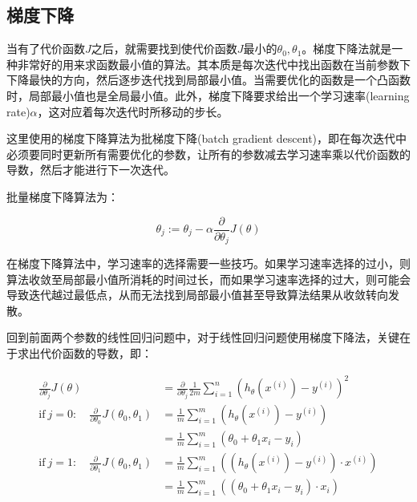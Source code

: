 \documentclass[12pt, a4paper]{article}
\begin{document}
\subsection{梯度下降}

当有了代价函数$J$之后，就需要找到使代价函数$J$最小的$\theta_0, \theta_1$。梯度下降法就是一种非常好的用来求函数最小值的算法。其本质是每次迭代中找出函数在当前参数下下降最快的方向，然后逐步迭代找到局部最小值。当需要优化的函数是一个凸函数时，局部最小值也是全局最小值。此外，梯度下降要求给出一个学习速率(learning rate)$\alpha$，这对应着每次迭代时所移动的步长。

这里使用的梯度下降算法为批梯度下降(batch gradient descent)，即在每次迭代中必须要同时更新所有需要优化的参数，让所有的参数减去学习速率乘以代价函数的导数，然后才能进行下一次迭代。

批量梯度下降算法为：

\begin{equation*}
    \theta_j:=\theta_j-\alpha\frac{\partial}{\partial\theta_j}J(\theta)
\end{equation*}

在梯度下降算法中，学习速率的选择需要一些技巧。如果学习速率选择的过小，则算法收敛至局部最小值所消耗的时间过长，而如果学习速率选择的过大，则可能会导致迭代越过最低点，从而无法找到局部最小值甚至导致算法结果从收敛转向发散。

回到前面两个参数的线性回归问题中，对于线性回归问题使用梯度下降法，关键在于求出代价函数的导数，即：

\begin{align*}
    \frac{\partial}{\partial\theta_j}J(\theta)                                & =\frac{\partial}{\partial\theta_j}\frac{1}{2m}\sum_{i=1}^{n}(h_\theta(x^{(i)})-y^{(i)})^2 \\
    \text{if}\ j=0:\quad\frac{\partial}{\partial\theta_0}J(\theta_0,\theta_1) & =\frac{1}{m}\sum_{i=1}^{m}(h_\theta(x^{(i)})-y^{(i)})                                     \\
                                                                              & =\frac{1}{m}\sum_{i=1}^{m}(\theta_0+\theta_1x_i-y_i)                                      \\
    \text{if}\ j=1:\quad\frac{\partial}{\partial\theta_1}J(\theta_0,\theta_1) & =\frac{1}{m}\sum_{i=1}^{m}((h_\theta(x^{(i)})-y^{(i)})\cdot x^{(i)})                      \\
                                                                              & =\frac{1}{m}\sum_{i=1}^{m}((\theta_0+\theta_1x_i-y_i)\cdot x_i)
\end{align*}
\end{document}
